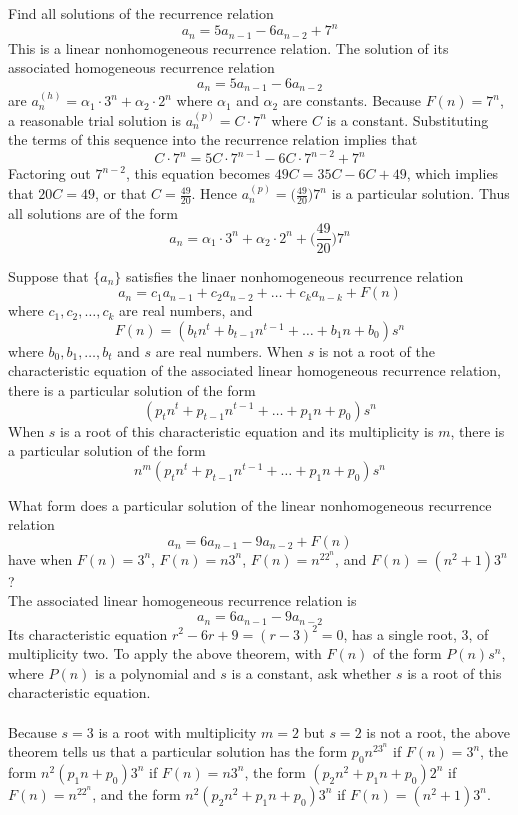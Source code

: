 \documentclass[12pt]{article}
\begin{document}
\begin{example} Find all solutions of the recurrence relation $$a_n = 5a_{n - 1} - 6a_{n - 2} + 7^n$$ 
This is a linear nonhomogeneous recurrence relation. The solution of its associated homogeneous recurrence relation $$a_n = 5a_{n - 1} - 6a_{n - 2} $$ are $a_n^{(h)} = \alpha_1 \cdot 3^n + \alpha_2 \cdot 2^n$ where $\alpha_1$ and $\alpha_2$ are constants. Because $F(n) = 7^n$, a reasonable trial solution is $a_n^{(p)} = C \cdot 7^n$ where $C$ is a constant. Substituting the terms of this sequence into the recurrence relation implies that $$C \cdot 7^n = 5C \cdot 7^{n - 1} - 6C \cdot 7^{n - 2} + 7^n $$ Factoring out $7^{n - 2}$, this equation becomes $49C = 35C - 6C + 49$, which implies that $20C = 49$, or that $C = \frac{49}{20}$. Hence $a_n^{(p)} = \Big(\frac{49}{20}\Big)7^n$ is a particular solution. Thus all solutions are of the form $$a_n = \alpha_1 \cdot 3^n + \alpha_2 \cdot 2^n + \Big( \frac{49}{20}\Big)7^n $$ \end{example} 

\begin{theorem} Suppose that $\{a_n\}$ satisfies the linaer nonhomogeneous recurrence relation $$a_n = c_1a_{n - 1} + c_2a_{n - 2} + \dots+ c_ka_{n - k} + F(n)$$ where $c_1, c_2, \dots, c_k$ are real numbers, and $$F(n) = (b_tn^t + b_{t - 1}n^{t - 1} + \dots + b_1n + b_0)s^n $$ where $b_0, b_1, \dots, b_t$ and $s$ are real numbers. When $s$ is not a root of the characteristic equation of the associated linear homogeneous recurrence relation, there is a particular solution of the form $$(p_tn^t + p_{t - 1}n^{t - 1} + \dots + p_1n + p_0)s^n$$ When $s$ is a root of this characteristic equation and its multiplicity is $m$, there is a particular solution of the form $$n^m(p_tn^t + p_{t - 1}n^{t - 1} + \dots + p_1n + p_0)s^n $$ \end{theorem} 

\begin{example} What form does a particular solution of the linear nonhomogeneous recurrence relation $$a_n = 6a_{n - 1} - 9a_{n - 2} + F(n)$$ have when $F(n) = 3^n$, $F(n) = n3^n$, $F(n) = n^22^n$, and $F(n) = (n^2 + 1)3^n$? \\ 
The associated linear homogeneous recurrence relation is $$a_n = 6a_{n - 1} - 9a_{n - 2} $$ Its characteristic equation $r^2 - 6r + 9 = (r - 3)^2 = 0$, has a single root, 3, of multiplicity two. To apply the above theorem, with $F(n)$ of the form $P(n)s^n$, where $P(n)$ is a polynomial and $s$ is a constant, ask whether $s$ is a root of this characteristic equation. \\~\\ 
Because $s = 3$ is a root with multiplicity $m = 2$ but $s = 2$ is not a root, the above theorem tells us that a particular solution has the form $p_0n^23^n$ if $F(n) = 3^n$, the form $n^2(p_1n + p_0)3^n$ if $F(n) = n3^n$, the form $(p_2n^2 + p_1n + p_0)2^n$ if $F(n) = n^22^n$, and the form $n^2(p_2n^2 + p_1n + p_0)3^n$ if $F(n) = (n^2 + 1)3^n$. \end{example} 
\end{document}
